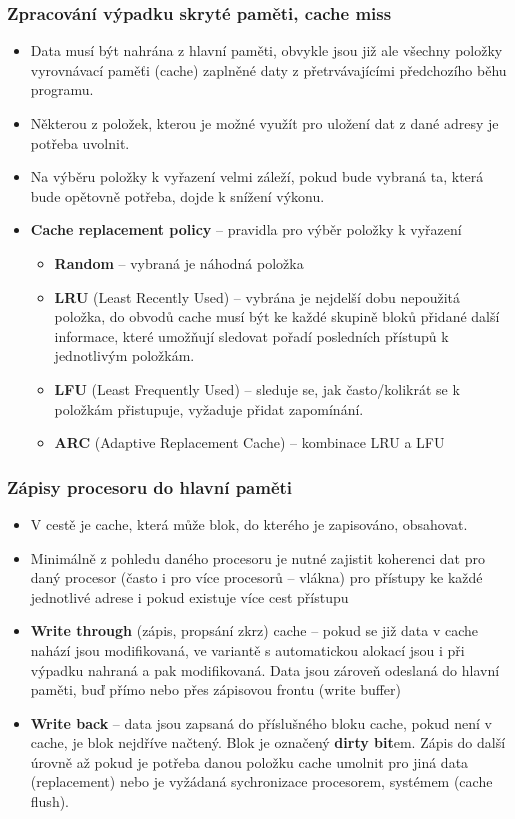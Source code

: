 \documentclass{beamer}
\begin{document}
\begin{frame}
\frametitle{Zpracování výpadku skryté paměti, cache miss}

\begin{itemize}
\item Data musí být nahrána z hlavní paměti, obvykle jsou již ale všechny položky vyrovnávací paměťi (cache) zaplněné daty z přetrvávajícími předchozího běhu programu.
\item Některou z položek, kterou je možné využít pro uložení dat z dané adresy je potřeba uvolnit.
\item Na výběru položky k vyřazení velmi záleží, pokud bude vybraná ta, která bude opětovně potřeba, dojde k snížení výkonu.
\item \textbf{Cache replacement policy} -- pravidla pro výběr položky k vyřazení
\begin{itemize}
\item \textbf{Random} -- vybraná je náhodná položka
\item \textbf{LRU} (Least Recently Used) -- vybrána je nejdelší dobu nepoužitá položka, do obvodů cache musí být ke každé skupině bloků přidané další informace, které umožňují sledovat pořadí posledních přístupů k jednotlivým položkám.
\item \textbf{LFU} (Least Frequently Used) -- sleduje se, jak často/kolikrát se k položkám přistupuje, vyžaduje přidat zapomínání.
\item \textbf{ARC} (Adaptive Replacement Cache) – kombinace LRU a LFU
\end{itemize}
\end{itemize}

\end{frame}

\begin{frame}
\frametitle{Zápisy procesoru do hlavní paměti}

\begin{itemize}
\item V cestě je cache, která může blok, do kterého je zapisováno, obsahovat.
\item Minimálně z pohledu daného procesoru je nutné zajistit koherenci dat pro daný procesor (často i pro více procesorů -- vlákna) pro přístupy ke každé jednotlivé adrese i pokud existuje více cest přístupu 
\item \textbf{Write through} (zápis, propsání zkrz) cache -- pokud se již data v cache nahází jsou modifikovaná, ve variantě s automatickou alokací jsou i při výpadku nahraná a pak modifikovaná. Data jsou zároveň odeslaná do hlavní paměti, buď přímo nebo přes zápisovou frontu (write buffer)
\item \textbf{Write back} -- data jsou zapsaná do příslušného bloku cache, pokud není v cache, je blok nejdříve načtený. Blok je označený \textbf{dirty bit}em. Zápis do další úrovně až pokud je potřeba danou položku cache umolnit pro jiná data (replacement) nebo je vyžádaná sychronizace procesorem, systémem (cache flush).
\end{itemize}

\end{frame}
\end{document}
